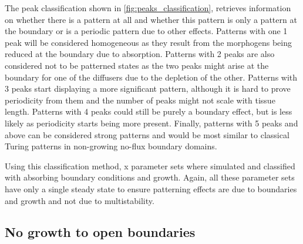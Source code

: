 The peak classification shown in \ref{fig:peaks_classification}, retrieves information on whether there is a pattern at all and whether this pattern is only a pattern at the boundary or is a periodic pattern due to other effects.
Patterns with one 1 peak will be considered homogeneous as they result from the morphogens being reduced at the boundary due to absorption.
Patterns with 2 peaks are also considered not to be patterned states as the two peaks might arise at the boundary for one of the diffusers due to the depletion of the other.
Patterns with 3 peaks start displaying a more significant pattern, although it is hard to prove periodicity from them and the number of peaks might not scale with tissue length.
Patterns with 4 peaks could still be purely a boundary effect, but is less likely as periodicity starts being more present.
Finally, patterns with 5 peaks and above can be considered strong patterns and would be most similar to classical Turing patterns in non-growing no-flux boundary domains.


Using this classification method, x parameter sets where simulated and classified with absorbing boundary conditions and growth.
Again, all these parameter sets have only a single steady state to ensure patterning effects are due to boundaries and growth and not due to multistability.



\subsection{No growth to open boundaries}

